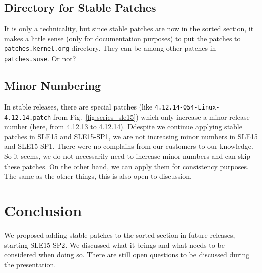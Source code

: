 \documentclass[10pt]{llncs}
\newcommand{\code}[2][]{\lstinline[columns=fullflexible, #1]$#2$}
\newcommand{\file}[2][]{\code[language={}, #1]{#2}}
\begin{document}
\subsection{Directory for Stable Patches}
It is only a technicality, but since stable patches are now in the sorted
section, it makes a little sense (only for documentation purposes) to put the
patches to \file{patches.kernel.org} directory. They can be among other
patches in \file{patches.suse}. Or not?

\subsection{Minor Numbering}
In stable releases, there are special patches (like
\file{4.12.14-054-Linux-4.12.14.patch} from Fig.\ \ref{fig:series_sle15})
which only increase a minor release number (here, from 4.12.13 to 4.12.14).
Ddespite we continue applying stable patches in SLE15 and SLE15-SP1, we
are not increasing minor numbers in SLE15 and SLE15-SP1. There were no
complains from our customers to our knowledge.  So it seems, we do not
necessarily need to increase minor numbers and can skip these patches. On the
other hand, we can apply them for consistency purposes. The same as the other
things, this is also open to discussion.

\section{Conclusion} \label{sec:concl}
We proposed adding stable patches to the sorted section in future releases,
starting SLE15-SP2. We discussed what it brings and what needs to be
considered when doing so. There are still open questions to be discussed
during the presentation.



\end{document}
